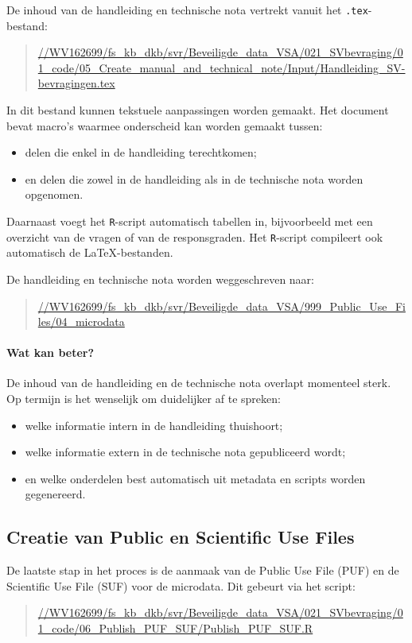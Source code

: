 \documentclass{VSAnote}
\begin{document}
De inhoud van de handleiding en technische nota vertrekt vanuit het \texttt{.tex}-bestand:
\begin{quote}
\url{//WV162699/fs_kb_dkb/svr/Beveiligde_data_VSA/021_SVbevraging/01_code/05_Create_manual_and_technical_note/Input/Handleiding_SV-bevragingen.tex}
\end{quote}

In dit bestand kunnen tekstuele aanpassingen worden gemaakt. Het document bevat macro's waarmee onderscheid kan worden gemaakt tussen:
\begin{itemize}[nosep]
\item delen die enkel in de handleiding terechtkomen;
\item en delen die zowel in de handleiding als in de technische nota worden opgenomen.
\end{itemize}

Daarnaast voegt het \verb+R+-script automatisch tabellen in, bijvoorbeeld met een overzicht van de vragen of van de responsgraden. Het \verb+R+-script compileert ook automatisch de \LaTeX-bestanden.

De handleiding en technische nota worden weggeschreven naar:
\begin{quote}
\url{//WV162699/fs_kb_dkb/svr/Beveiligde_data_VSA/999_Public_Use_Files/04_microdata}
\end{quote}

\paragraph{Wat kan beter?}

De inhoud van de handleiding en de technische nota overlapt momenteel sterk. Op termijn is het wenselijk om duidelijker af te spreken:
\begin{itemize}[nosep]
\item welke informatie intern in de handleiding thuishoort;
\item welke informatie extern in de technische nota gepubliceerd wordt;
\item en welke onderdelen best automatisch uit metadata en scripts worden gegenereerd.
\end{itemize}



\subsection{Creatie van Public en Scientific Use Files}

De laatste stap in het proces is de aanmaak van de Public Use File (PUF) en de Scientific Use File (SUF) voor de microdata. Dit gebeurt via het script:
\begin{quote}
\url{//WV162699/fs_kb_dkb/svr/Beveiligde_data_VSA/021_SVbevraging/01_code/06_Publish_PUF_SUF/Publish_PUF_SUF.R}
\end{quote}
\end{document}
